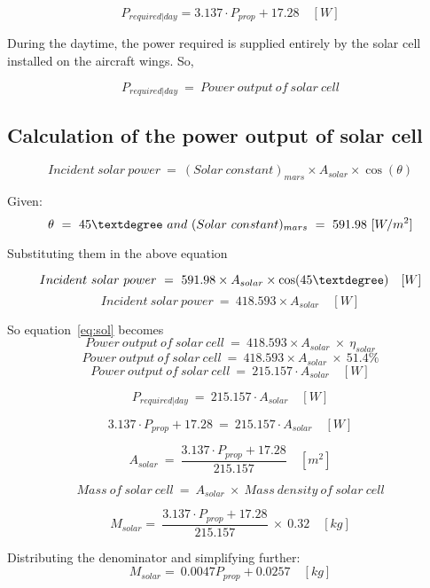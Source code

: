 \[
P_{required|day} = 3.137 \cdot P_{prop} + 17.28 \quad [W]
\]

\p During the daytime, the power required is supplied entirely by the solar cell installed on the aircraft wings. So,

\[
P_{required|day} \ = \ Power \ output \ of \ solar \ cell
\]

\subsection{Calculation of the power output of solar cell}


\[
Incident \ solar \ power \ = \ (Solar\ constant)_{mars} \times A_{solar} \times \cos(\theta)
\]


Given:
\[
\theta \ = \ 45 \textdegree \ and \  (Solar\ constant)_{mars} \ = \ 591.98 \ [W/m^2]
\]

Substituting them in the above equation

\[
Incident \ solar \ power \ = \ 591.98 \times A_{solar} \times \cos(45\textdegree) \quad [W]
\]
\[
Incident \ solar \ power \ = \ 418.593 \times A_{solar} \quad [W]
\]

So equation~\ref{eq:sol} becomes
\[
Power \ output \ of \ solar \ cell \ = \ 418.593 \times A_{solar} \ \times \ \eta_{solar}
\]
\[
Power \ output \ of \ solar \ cell \ = \ 418.593 \times A_{solar} \ \times \ 51.4\%
\]
\[
Power \ output \ of \ solar \ cell \ = \ 215.157 \cdot A_{solar} \quad [W]
\]

\[
P_{required|day} \ = \ 215.157 \cdot A_{solar} \quad [W]
\]

\[
3.137 \cdot P_{prop} + 17.28 \ = \ 215.157 \cdot A_{solar} \quad [W]
\]

\[
A_{solar} \ = \ \frac{ 3.137 \cdot P_{prop} + 17.28 }{ 215.157 } \quad [m^2]
\]

\[
Mass \ of \ solar \ cell \ = \ A_{solar} \ \times \ Mass \ density \ of \ solar \ cell
\]

\[
M_{solar} = \ \frac{ 3.137 \cdot P_{prop} + 17.28 }{ 215.157 } \ \times \ 0.32 \quad [kg]
\]

Distributing the denominator and simplifying further:
\[
M_{solar} = \ 0.0047 P_{prop} + 0.0257  \quad [kg]
\]

\vspace{0.5cm}

